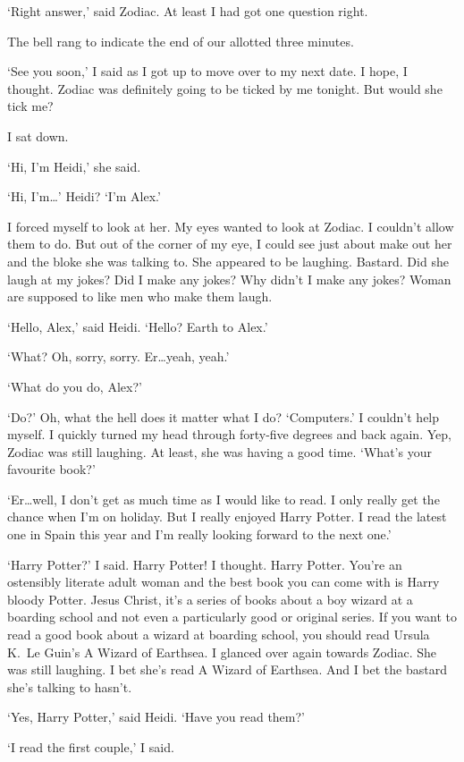 `Right answer,' said Zodiac. At least I had got one question right.

The bell rang to indicate the end of our allotted three minutes.

`See you soon,' I said as I got up to move over to my next date. I
hope, I thought. Zodiac was definitely going to be ticked by me
tonight. But would she tick me?

I sat down.

`Hi, I'm Heidi,' she said.

`Hi, I'm\dots' Heidi? `I'm Alex.'

I forced myself to look at her. My eyes wanted to look at Zodiac. I
couldn't allow them to do. But out of the corner of my eye, I could
see just about make out her and the bloke she was talking to. She
appeared to be laughing. Bastard. Did she laugh at my jokes? Did I
make any jokes? Why didn't I make any jokes? Woman are supposed to
like men who make them laugh.

`Hello, Alex,' said Heidi. `Hello? Earth to Alex.'

`What? Oh, sorry, sorry. Er\dots yeah, yeah.'

`What do you do, Alex?'

`Do?' Oh, what the hell does it matter what I do? `Computers.' I
couldn't help myself. I quickly turned my head through forty-five
degrees and back again. Yep, Zodiac was still laughing. At least,
she was having a good time. `What's your favourite book?'

`Er\dots well, I don't get as much time as I would like to read. I
only really get the chance when I'm on holiday. But I really enjoyed
Harry Potter. I read the latest one in Spain this year and I'm
really looking forward to the next one.'

`Harry Potter?' I said. Harry Potter! I thought. Harry Potter.
You're an ostensibly literate adult woman and the best book you can
come with is Harry bloody Potter. Jesus Christ, it's a series of
books about a boy wizard at a boarding school and not even a
particularly good or original series. If you want to read a good book about a
wizard at boarding school, you should read Ursula K.~Le Guin's
{\twelvesl A Wizard of Earthsea}. I glanced over again towards
Zodiac. She was still laughing. I bet she's read {\twelvesl A Wizard
of Earthsea}. And I bet the bastard she's talking to hasn't.

`Yes, Harry Potter,' said Heidi. `Have you read them?'

`I read the first couple,' I said.

